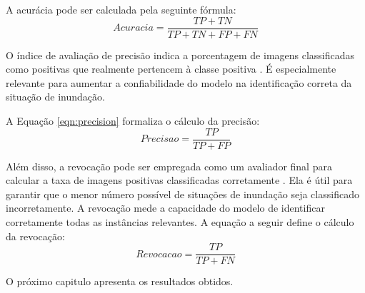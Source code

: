 A acurácia pode ser calculada pela seguinte fórmula:
\begin{equation}
    \label{eqn:accuracy}
    Acuracia = \frac{TP+TN}{TP+TN+FP+FN}
\end{equation}

O índice de avaliação de precisão indica a porcentagem de imagens classificadas como positivas que realmente pertencem à classe positiva \cite{FAWCETT2006861}. 
É especialmente relevante para aumentar a confiabilidade do modelo na identificação correta da situação de inundação.

A Equação \ref{eqn:precision} formaliza o cálculo da precisão:
\begin{equation}
    \label{eqn:precision}
    Precisao = \frac{TP}{TP+FP}
\end{equation}

Além disso, a revocação pode ser empregada como um avaliador final para calcular a taxa de imagens positivas classificadas corretamente \cite{MurphyProbabilistic}. 
Ela é útil para garantir que o menor número possível de situações de inundação seja classificado incorretamente. A revocação mede a capacidade do modelo de identificar corretamente todas as instâncias relevantes.
A equação a seguir define o cálculo da revocação:
\begin{equation}
    \label{eqn:recall}
    Revocacao = \frac{TP}{TP+FN}
\end{equation}

O próximo capitulo apresenta os resultados obtidos. 